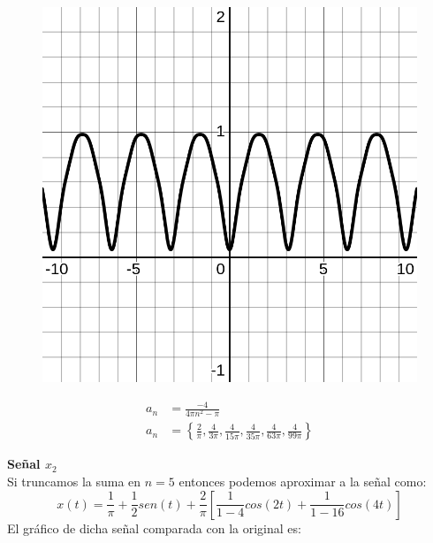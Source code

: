 \documentclass[12pt,a4paper]{report}
\begin{document}
\begin{enumerate}[label=\alph*),left=0pt]
\begin{itemize}[left=0pt]
\begin{figure}[h]
  \centering
  \begin{minipage}[h]{0.4\textwidth}
    \includegraphics[width=1\textwidth]{images/ej2.1.png}
  \end{minipage}
  \hspace{5mm}
  \begin{minipage}[h]{0.4\textwidth}
    $$
    \begin{aligned}
      a_{n} &=\frac{-4}{4\pi n^{2} -\pi }\\
      a_{n} &=\left\{\frac{2}{\pi } ,\frac{4}{3\pi } ,\frac{4}{15\pi } ,\frac{4}{35\pi } ,\frac{4}{63\pi } ,\frac{4}{99\pi }\right\}
    \end{aligned}
    $$
  \end{minipage}
\end{figure}
\textbf{Señal $x_2$}\\

Si truncamos la suma en $n=5$ entonces podemos aproximar a la señal como:
        $$
        x(t)=\frac{1}{\pi}+\frac{1}{2}sen(t)+\frac{2}{\pi}[\frac{1}{1-4}cos(2t)+\frac{1}{1-16}cos(4t)]
        $$
 El gráfico de dicha señal comparada con la original es:\\


\end{itemize}
\end{enumerate}
\end{document}
